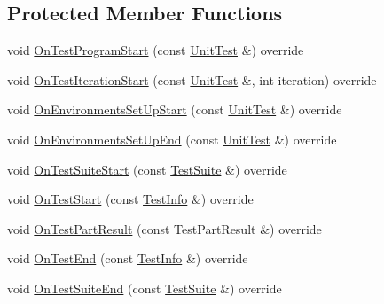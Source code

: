 \subsection*{Protected Member Functions}
\begin{DoxyCompactItemize}
\item 
void \mbox{\hyperlink{classtesting_1_1internal_1_1_event_recording_listener2_a461f961badc2be6e633df136bc8e3d29}{On\+Test\+Program\+Start}} (const \mbox{\hyperlink{classtesting_1_1_unit_test}{Unit\+Test}} \&) override
\item 
void \mbox{\hyperlink{classtesting_1_1internal_1_1_event_recording_listener2_ab208d8583e6593b4c7d89db6f8f2600b}{On\+Test\+Iteration\+Start}} (const \mbox{\hyperlink{classtesting_1_1_unit_test}{Unit\+Test}} \&, int iteration) override
\item 
void \mbox{\hyperlink{classtesting_1_1internal_1_1_event_recording_listener2_a555f80451b123922a7f21930e45a256f}{On\+Environments\+Set\+Up\+Start}} (const \mbox{\hyperlink{classtesting_1_1_unit_test}{Unit\+Test}} \&) override
\item 
void \mbox{\hyperlink{classtesting_1_1internal_1_1_event_recording_listener2_ae6a3c429dd5df55c869377186411a90a}{On\+Environments\+Set\+Up\+End}} (const \mbox{\hyperlink{classtesting_1_1_unit_test}{Unit\+Test}} \&) override
\item 
void \mbox{\hyperlink{classtesting_1_1internal_1_1_event_recording_listener2_a6bc3ac71f7f96e9c62b0c7dffd5f66b0}{On\+Test\+Suite\+Start}} (const \mbox{\hyperlink{classtesting_1_1_test_suite}{Test\+Suite}} \&) override
\item 
void \mbox{\hyperlink{classtesting_1_1internal_1_1_event_recording_listener2_ac3231fff64b23bbd05e3a2cc57e20df9}{On\+Test\+Start}} (const \mbox{\hyperlink{classtesting_1_1_test_info}{Test\+Info}} \&) override
\item 
void \mbox{\hyperlink{classtesting_1_1internal_1_1_event_recording_listener2_a0c7bd2ef9f0e467b408dcb4c984cb3fc}{On\+Test\+Part\+Result}} (const Test\+Part\+Result \&) override
\item 
void \mbox{\hyperlink{classtesting_1_1internal_1_1_event_recording_listener2_a8651cee935f60407bd65d0162a6d9629}{On\+Test\+End}} (const \mbox{\hyperlink{classtesting_1_1_test_info}{Test\+Info}} \&) override
\item 
void \mbox{\hyperlink{classtesting_1_1internal_1_1_event_recording_listener2_aefd67a80de94cdd8e2e43c0fad812bd2}{On\+Test\+Suite\+End}} (const \mbox{\hyperlink{classtesting_1_1_test_suite}{Test\+Suite}} \&) override

\end{DoxyCompactItemize}
